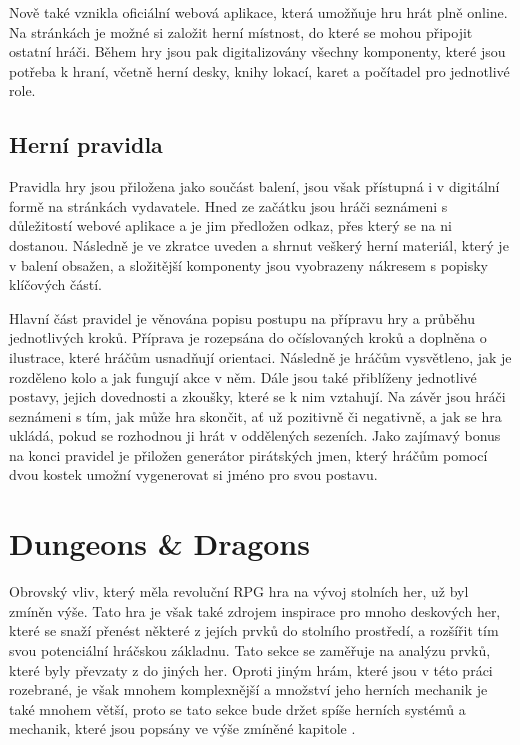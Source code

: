 Nově také vznikla oficiální webová aplikace, která umožňuje hru hrát plně online. Na stránkách je možné si založit herní místnost, do které se mohou připojit ostatní hráči. Během hry jsou pak digitalizovány všechny komponenty, které jsou potřeba k hraní, včetně herní desky, knihy lokací, karet a počítadel pro jednotlivé role. \cite{fw_remote_app}

\subsection{Herní pravidla}
\label{subsec:fw_rules}

Pravidla hry  jsou přiložena jako součást balení, jsou však přístupná i v digitální formě na stránkách vydavatele. Hned ze začátku jsou hráči seznámeni s důležitostí webové aplikace a je jim předložen odkaz, přes který se na ni dostanou. Následně je ve zkratce uveden a shrnut veškerý herní materiál, který je v balení obsažen, a složitější komponenty jsou vyobrazeny nákresem s popisky klíčových částí.

Hlavní část pravidel je věnována popisu postupu na přípravu hry a průběhu jednotlivých kroků. Příprava je rozepsána do očíslovaných kroků a doplněna o ilustrace, které hráčům usnadňují orientaci. Následně je hráčům vysvětleno, jak je rozděleno kolo a jak fungují akce v něm. Dále jsou také přiblíženy jednotlivé postavy, jejich dovednosti a zkoušky, které se k nim vztahují. Na závěr jsou hráči seznámeni s tím, jak může hra skončit, ať už pozitivně či negativně, a jak se hra ukládá, pokud se rozhodnou ji hrát v oddělených sezeních. Jako zajímavý bonus na konci pravidel je přiložen generátor pirátských jmen, který hráčům pomocí dvou kostek umožní vygenerovat si jméno pro svou postavu.



\section{Dungeons \& Dragons}
\label{sec:dungeons_and_dragons}

Obrovský vliv, který měla revoluční RPG hra  na vývoj stolních her, už byl zmíněn výše. Tato hra je však také zdrojem inspirace pro mnoho deskových her, které se snaží přenést některé z jejích prvků do stolního prostředí, a rozšířit tím svou potenciální hráčskou základnu. Tato sekce se zaměřuje na analýzu prvků, které byly převzaty z \dnd{} do jiných her. Oproti jiným hrám, které jsou v této práci rozebrané, je však \dnd{} mnohem komplexnější a množství jeho herních mechanik je také mnohem větší, proto se tato sekce bude držet spíše herních systémů a mechanik, které jsou popsány ve výše zmíněné kapitole \textit{}. \cite{dnd_beyond_2023}


